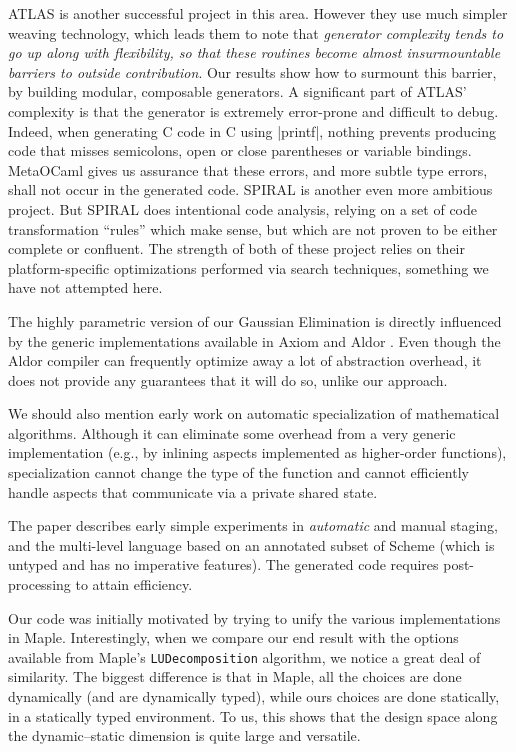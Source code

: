 \documentclass{elsart}
\begin{document}
ATLAS \cite{ATLAS} is another successful project in this area.
However they use much simpler weaving technology, which leads them to
note that \emph{generator complexity tends to go up along with
  flexibility, so that these routines become almost insurmountable
  barriers to outside contribution}. Our results show how to surmount
this barrier, by building modular, composable generators. A
significant part of ATLAS' complexity is that the generator is
extremely error-prone and difficult to debug.  Indeed, when generating
C code in C using |printf|, nothing prevents producing code that
misses semicolons, open or close parentheses or variable
bindings. MetaOCaml gives us assurance that these errors, and more
subtle type errors, shall not occur in the generated code.  SPIRAL
\cite{Pueschel:05} is another even more ambitious project.  But
SPIRAL does intentional code analysis, relying on a set of code
transformation ``rules'' which make sense, but which are not proven to
be either complete or confluent.  The strength of both of these
project relies on their platform-specific optimizations performed via
search techniques, something we have not attempted here.

The highly parametric version of our Gaussian Elimination is directly
influenced by the generic implementations available in Axiom
\cite{Axiom} and Aldor \cite{Watt:2002:HCA}.  Even though the Aldor
compiler can frequently optimize away a lot of abstraction overhead, 
it does not provide any guarantees that it will do so, unlike our
approach.

We should also mention early work \cite{Gluck95} on automatic
specialization of mathematical algorithms. Although it can eliminate
some overhead from a very generic implementation (e.g., by inlining
aspects implemented as higher-order functions), specialization cannot
change the type of the function and cannot efficiently handle aspects
that communicate via a private shared state.

The paper \cite{GluckJ97} describes early simple experiments in
\emph{automatic} and manual staging, and the multi-level language
based on an annotated subset of Scheme (which is untyped and has no
imperative features). The generated code requires post-processing to
attain efficiency.  

Our code was initially motivated by trying to unify the various
implementations in Maple.  Interestingly, when we compare our end 
result with the options available from Maple's \texttt{LUDecomposition}
algorithm, we notice a great deal of similarity.  The biggest difference
is that in Maple, all the choices are done dynamically (and are dynamically
typed), while ours choices are done statically, in a statically typed
environment.  To us, this shows that the
design space along the dynamic--static dimension is quite large and
versatile.
\end{document}
